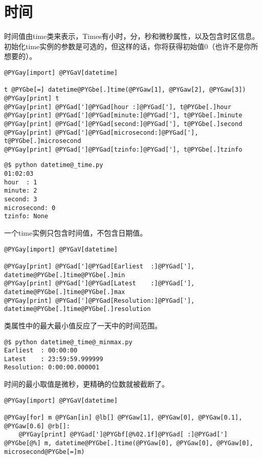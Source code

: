 \documentclass[a4paper,10pt,english]{manual}
\begin{document}
\section{时间}

时间值由time类来表示，Times有小时，分，秒和微秒属性，以及包含时区信息。初始化time实例的参数是可选的，但这样的话，你将获得初始值0（也许不是你所想要的）。

\begin{Verbatim}[commandchars=@\[\]]
@PYGay[import] @PYGaV[datetime]

t @PYGbe[=] datetime@PYGbe[.]time(@PYGaw[1], @PYGaw[2], @PYGaw[3])
@PYGay[print] t
@PYGay[print] @PYGad[']@PYGad[hour :]@PYGad['], t@PYGbe[.]hour
@PYGay[print] @PYGad[']@PYGad[minute:]@PYGad['], t@PYGbe[.]minute
@PYGay[print] @PYGad[']@PYGad[second:]@PYGad['], t@PYGbe[.]second
@PYGay[print] @PYGad[']@PYGad[microsecond:]@PYGad['], t@PYGbe[.]microsecond
@PYGay[print] @PYGad[']@PYGad[tzinfo:]@PYGad['], t@PYGbe[.]tzinfo
\end{Verbatim}

\begin{Verbatim}[commandchars=@\[\]]
@$ python datetime@_time.py
01:02:03
hour  : 1
minute: 2
second: 3
microsecond: 0
tzinfo: None
\end{Verbatim}

一个time实例只包含时间值，不包含日期值。

\begin{Verbatim}[commandchars=@\[\]]
@PYGay[import] @PYGaV[datetime]

@PYGay[print] @PYGad[']@PYGad[Earliest  :]@PYGad['], datetime@PYGbe[.]time@PYGbe[.]min
@PYGay[print] @PYGad[']@PYGad[Latest    :]@PYGad['], datetime@PYGbe[.]time@PYGbe[.]max
@PYGay[print] @PYGad[']@PYGad[Resolution:]@PYGad['], datetime@PYGbe[.]time@PYGbe[.]resolution
\end{Verbatim}

类属性中的最大最小值反应了一天中的时间范围。

\begin{Verbatim}[commandchars=@\[\]]
@$ python datetime@_time@_minmax.py
Earliest  : 00:00:00
Latest    : 23:59:59.999999
Resolution: 0:00:00.000001
\end{Verbatim}

时间的最小取值是微秒，更精确的位数就被截断了。

\begin{Verbatim}[commandchars=@\[\]]
@PYGay[import] @PYGaV[datetime]

@PYGay[for] m @PYGan[in] @lb[] @PYGaw[1], @PYGaw[0], @PYGaw[0.1], @PYGaw[0.6] @rb[]:
    @PYGay[print] @PYGad[']@PYGbf[@%02.1f]@PYGad[ :]@PYGad['] @PYGbe[@%] m, datetime@PYGbe[.]time(@PYGaw[0], @PYGaw[0], @PYGaw[0], microsecond@PYGbe[=]m)
\end{Verbatim}
\end{document}
